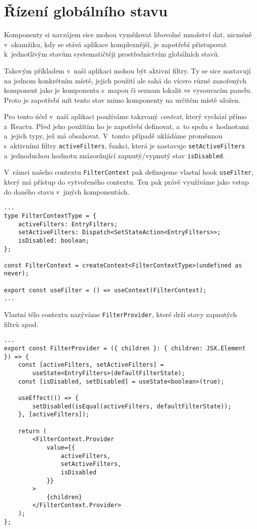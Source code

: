 \hypertarget{ux159uxedzenuxed-globuxe1lnuxedho-stavu}{%
\section{Řízení globálního stavu}\label{ux159uxedzenuxed-globuxe1lnuxedho-stavu}}

Komponenty si navzájem sice mohou vyměňovat libovolné množství dat, nicméně v~okamžiku, kdy se stává aplikace komplexnější, je zapotřebí přistupovat k~jednotlivým stavům systematičtěji prostřednictvím globálních stavů.

Takovým příkladem v~naší aplikaci mohou být aktivní filtry. Ty se sice nastavují na jednom konkrétním místě, jejich použití ale sahá do vícero různé zanořených komponent jako je komponenta s~mapou či seznam lokalit ve vysouvacím panelu. Proto je zapotřebí mít tento stav mimo komponenty na určitém místě uložen.

Pro tento účel v~naší aplikaci používáme takzvaný \emph{context}, který vychází přímo z~Reactu. Před jeho použitím ho je zapotřebí definovat, a~to spolu s~hodnotami a~jejich typy, jež má obsahovat. V~tomto případě ukládáme proměnnou s~aktivními filtry \verb|activeFilters|, funkci, která je nastavuje \verb|setActiveFilters| a~jednoduchou hodnotu znázorňující zapnutý/vypnutý stav \verb|isDisabled|.

V~rámci našeho contextu \verb|FilterContext| pak definujeme vlastní hook \verb|useFilter|, který má přístup do vytvořeného contextu. Ten pak právě využíváme jako vstup do daného stavu v~jiných komponentách.

\begin{verbatim}
...
type FilterContextType = {
    activeFilters: EntryFilters;
    setActiveFilters: Dispatch<SetStateAction<EntryFilters>>;
    isDisabled: boolean;
};

const FilterContext = createContext<FilterContextType>(undefined as never);

export const useFilter = () => useContext(FilterContext);
...
\end{verbatim}

Vlastní tělo contextu nazýváme \verb|FilterProvider|, které drží stavy zapnutých filtrů apod.

\begin{verbatim}
...
export const FilterProvider = ({ children }: { children: JSX.Element }) => {
    const [activeFilters, setActiveFilters] =
        useState<EntryFilters>(defaultFilterState);
    const [isDisabled, setDisabled] = useState<boolean>(true);

    useEffect(() => {
        setDisabled(isEqual(activeFilters, defaultFilterState));
    }, [activeFilters]);

    return (
        <FilterContext.Provider
            value={{
                activeFilters,
                setActiveFilters,
                isDisabled
            }}
        >
            {children}
        </FilterContext.Provider>
    );
};
\end{verbatim}

